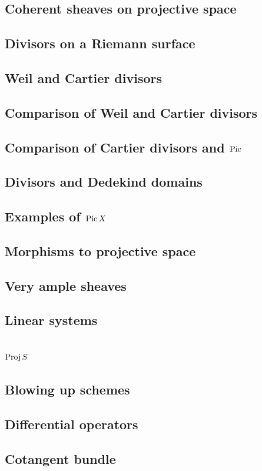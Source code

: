 \documentclass [11 pt, oneside, margin = 1 in] {article}
\begin{document}
\subsection{Coherent sheaves on projective space}
\subsection{Divisors on a Riemann surface}
\subsection{Weil and Cartier divisors}
\subsection{Comparison of Weil and Cartier divisors}
\subsection{Comparison of Cartier divisors and $\operatorname{Pic}$}
\subsection{Divisors and Dedekind domains}
\subsection{Examples of $\operatorname{Pic} X$}
\subsection{Morphisms to projective space}
\subsection{Very ample sheaves}
\subsection{Linear systems}
\subsection{$\operatorname{Proj} S$}
\subsection{Blowing up schemes}
\subsection{Differential operators}
\subsection{Cotangent bundle}
\end{document}

